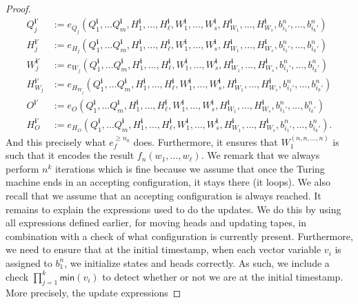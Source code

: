 \begin{proof}
\begin{align*}
		Q_j^{\mathbf{i}'}&:=e_{Q_j}(Q_1^{\mathbf{i}},\ldots Q_m^{\mathbf{i}},H_1^{\mathbf{i}},\ldots,H_\ell^{\mathbf{i}},W_1^{\mathbf{i}},\ldots,W_s^{\mathbf{i}},H_{W_1}^{\mathbf{i}},\ldots,H_{W_s}^{\mathbf{i}},b_{i_1'}^n,\ldots,b_{i_k'}^n)\\
		H_j^{\mathbf{i}'}&:=e_{H_j}(Q_1^{\mathbf{i}},\ldots Q_m^{\mathbf{i}},H_1^{\mathbf{i}},\ldots,H_\ell^{\mathbf{i}},W_1^{\mathbf{i}},\ldots,W_s^{\mathbf{i}},H_{W_1}^{\mathbf{i}},\ldots,H_{W_s}^{\mathbf{i}},b_{i_1'}^n,\ldots,b_{i_k'}^n)\\
		W_j^{\mathbf{i}'}&:=e_{W_j}(Q_1^{\mathbf{i}},\ldots Q_m^{\mathbf{i}},H_1^{\mathbf{i}},\ldots,H_\ell^{\mathbf{i}},W_1^{\mathbf{i}},\ldots,W_s^{\mathbf{i}},H_{W_1}^{\mathbf{i}},\ldots,H_{W_s}^{\mathbf{i}},b_{i_1'}^n,\ldots,b_{i_k'}^n)\\
				H_{W_j}^{\mathbf{i}'}&:=e_{H_{W_j}}(Q_1^{\mathbf{i}},\ldots Q_m^{\mathbf{i}},H_1^{\mathbf{i}},\ldots,H_\ell^{\mathbf{i}},W_1^{\mathbf{i}},\ldots,W_s^{\mathbf{i}},H_{W_1}^{\mathbf{i}},\ldots,H_{W_s}^{\mathbf{i}},b_{i_1'}^n,\ldots,b_{i_k'}^n)\\
O^{\mathbf{i}'}&:=e_{O}(Q_1^{\mathbf{i}},\ldots Q_m^{\mathbf{i}},H_1^{\mathbf{i}},\ldots,H_\ell^{\mathbf{i}},W_1^{\mathbf{i}},\ldots,W_s^{\mathbf{i}},H_{W_1}^{\mathbf{i}},\ldots,H_{W_s}^{\mathbf{i}},b_{i_1'}^n,\ldots,b_{i_k'}^n)\\
H_{O}^{\mathbf{i}'}&:=e_{H_O}(Q_1^{\mathbf{i}},\ldots Q_m^{\mathbf{i}},H_1^{\mathbf{i}},\ldots,H_\ell^{\mathbf{i}},W_1^{\mathbf{i}},\ldots,W_s^{\mathbf{i}},H_{W_1}^{\mathbf{i}},\ldots,H_{W_s}^{\mathbf{i}},b_{i_1'}^n,\ldots,b_{i_k'}^n).
	\end{align*}
And this precisely what $e_f^{\geq n_0}$ does. Furthermore,	it ensures that  $W_1^{(n,n,\ldots,n)}$ is such that it encodes the result $f_n(w_1,\ldots,w_\ell)$. We remark that we
always perform $n^k$ iterations which is fine because we assume that once the Turing machine ends in an accepting configuration,
it stays there (it loops). We also recall that we assume that an accepting configuration is always reached. It remains to
explain the expressions used to do the updates. We do this by using all expressions defined earlier, for moving heads and updating
tapes, in combination with a check of what configuration is currently present. Furthermore, we need to ensure that at the initial timestamp,
when each vector variable $v_i$ is assigned to $b_1^n$, we initialize states and heads correctly. As such, we include a check
$\prod_{j=1}^{k} \textsf{min}(v_i)$ to detect whether or not we are at the initial timestamp. More precisely, the update expressions

\end{proof}
